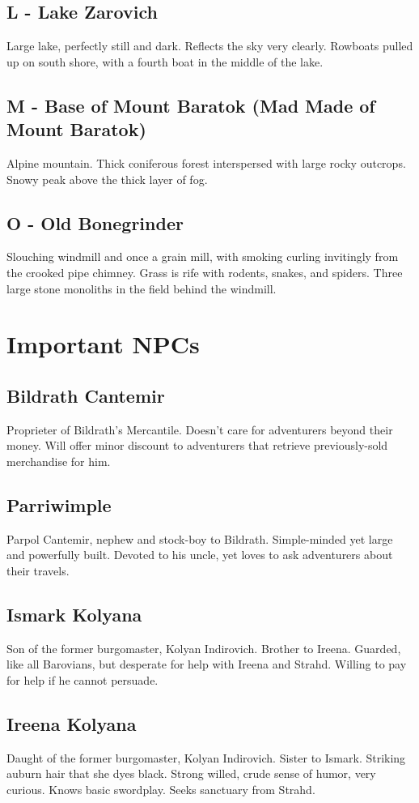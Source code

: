 \documentclass[a4paper,11pt]{article}
\begin{document}
\subsection{L - Lake Zarovich}
  Large lake, perfectly still and dark. Reflects the sky very clearly. Rowboats pulled up on south shore, with a
  fourth boat in the middle of the lake.
\subsection{M - Base of Mount Baratok (Mad Made of Mount Baratok)}
  Alpine mountain. Thick coniferous forest interspersed with large rocky outcrops. Snowy peak above the thick
  layer of fog.
\subsection{O - Old Bonegrinder}
  Slouching windmill and once a grain mill, with smoking curling invitingly from the crooked pipe chimney. Grass
  is rife with rodents, snakes, and spiders. Three large stone monoliths in the field behind the windmill.


\section{Important NPCs}
\label{sec:ImportantNPCs}
\subsection{Bildrath Cantemir}
  Proprieter of Bildrath's Mercantile. Doesn't care for adventurers beyond their money. Will offer minor discount
  to adventurers that retrieve previously-sold merchandise for him.
\subsection{Parriwimple}
  Parpol Cantemir, nephew and stock-boy to Bildrath. Simple-minded yet large and powerfully built. Devoted to 
  his uncle, yet loves to ask adventurers about their travels.
\subsection{Ismark Kolyana}
  Son of the former burgomaster, Kolyan Indirovich. Brother to Ireena. Guarded, like all Barovians, but 
  desperate for help with Ireena and Strahd. Willing to pay for help if he cannot persuade.
\subsection{Ireena Kolyana}
  Daught of the former burgomaster, Kolyan Indirovich. Sister to Ismark. Striking auburn hair that she dyes 
  black. Strong willed, crude sense of humor, very curious. Knows basic swordplay. Seeks sanctuary from Strahd.
\end{document}
